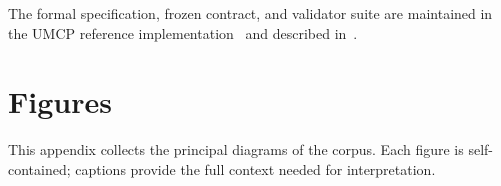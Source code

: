 \documentclass[
  aps,
  prd,
  twocolumn,
  superscriptaddress,
  nofootinbib,
  floatfix
]{revtex4-2}
\begin{document}
\begin{acknowledgments}
The formal specification, frozen contract, and validator suite are
maintained in the UMCP reference
implementation~\cite{umcpmetadatarepo} and described
in~\cite{paulus2025umcp,paulus2025episteme}.
\end{acknowledgments}

\appendix
\section{Figures}\label{app:figures}

This appendix collects the principal diagrams of the corpus.
Each figure is self-contained; captions provide the full
context needed for interpretation.
\vspace{-4pt}
\end{document}
